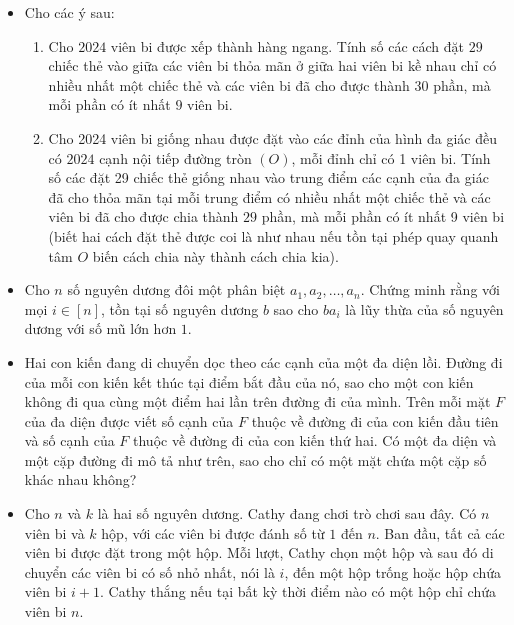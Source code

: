 \documentclass[11pt]{scrartcl}
\begin{document}
\begin{itemize}[label=, leftmargin=0em, itemsep=0.5em]
    \item \begin{btvn}
        Cho các ý sau:
        \begin{enumerate}[label=(\alph*)]
            \item Cho $2024$ viên bi được xếp thành hàng ngang. Tính số các cách đặt $29$ chiếc thẻ vào giữa các viên bi thỏa mãn ở giữa hai viên bi kề nhau chỉ có nhiều nhất một chiếc thẻ và các viên bi đã cho được thành $30$ phần, mà mỗi phần có ít nhất $9$ viên bi.
            \item Cho 2024 viên bi giống nhau được đặt vào các đỉnh của hình đa giác đều có $2024$ cạnh nội tiếp đường tròn $(O)$, mỗi đỉnh chỉ có 1 viên bi. Tính số các đặt 29 chiếc thẻ giống nhau vào trung điểm các cạnh của đa giác đã cho thỏa mãn tại mỗi trung điểm có nhiều nhất một chiếc thẻ và các viên bi đã cho được chia thành $29$ phần, mà mỗi phần có ít nhất 9 viên bi (biết hai cách đặt thẻ được coi là như nhau nếu tồn tại phép quay quanh tâm $O$ biến cách chia này thành cách chia kia).
        \end{enumerate}
    \end{btvn}
    \item \begin{btvn}
        Cho $n$ số nguyên dương đôi một phân biệt $a_1,a_2,\dots,a_n$. Chứng minh rằng với mọi $i \in [n]$, tồn tại số nguyên dương $b$ sao cho $ba_i$ là lũy thừa của số nguyên dương với số mũ lớn hơn $1$.
    \end{btvn}

   
    \item \begin{btvn}
        Hai con kiến đang di chuyển dọc theo các cạnh của một đa diện lồi. Đường đi của mỗi con kiến kết thúc tại điểm bắt đầu của nó, sao cho một con kiến không đi qua cùng một điểm hai lần trên đường đi của mình. Trên mỗi mặt $F$ của đa diện được viết số cạnh của $F$ thuộc về đường đi của con kiến đầu tiên và số cạnh của $F$ thuộc về đường đi của con kiến thứ hai. Có một đa diện và một cặp đường đi mô tả như trên, sao cho chỉ có một mặt chứa một cặp số khác nhau không?
    \end{btvn}
    \item \begin{btvn}
        Cho \( n \) và \( k \) là hai số nguyên dương. Cathy đang chơi trò chơi sau đây. Có \( n \) viên bi và \( k \) hộp, với các viên bi được đánh số từ \( 1 \) đến \( n \). Ban đầu, tất cả các viên bi được đặt trong một hộp. Mỗi lượt, Cathy chọn một hộp và sau đó di chuyển các viên bi có số nhỏ nhất, nói là \( i \), đến một hộp trống hoặc hộp chứa viên bi \( i+1 \). Cathy thắng nếu tại bất kỳ thời điểm nào có một hộp chỉ chứa viên bi \( n \).


\end{btvn}
\end{itemize}
\end{document}
